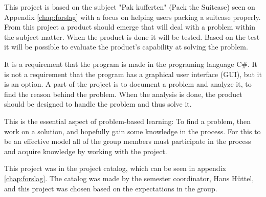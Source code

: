 This project is based on the subject "Pak kufferten" (Pack the Suitcase) seen on Appendix \ref{chap:forslag} with a focus on helping users packing a suitcase properly. From this project a product should emerge that will deal with a problem within the subject matter. When the product is done it will be tested. Based on the test it will be possible to evaluate the product's capability at solving the problem.

It is a requirement that the program is made in the programing language C\#. It is not a requirement that the program has a graphical user interface (GUI), but it is an option.
A part of the project is to document a problem and analyze it, to find the reason behind the problem. When the analysis is done, the product should be designed to handle the problem and thus solve it.

This is the essential aspect of problem-based learning: To find a problem, then work on a solution, and hopefully gain some knowledge in the process.
For this to be an effective model all of the group members must participate in the process and acquire knowledge by working with the project.

This project was in the project catalog, which can be seen in appendix \ref{chap:forslag}. The catalog was made by the semester coordinator, Hans Hüttel, and this project was chosen based on the expectations in the group.